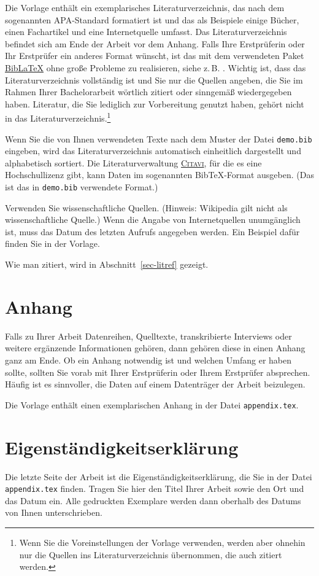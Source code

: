 Die Vorlage enthält ein exemplarisches Literaturverzeichnis, das nach dem
sogenannten APA-Standard formatiert ist und das als Beispiele einige Bücher,
einen Fachartikel und eine Internetquelle umfasst.  Das Literaturverzeichnis
befindet sich am Ende der Arbeit vor dem Anhang.  Falls Ihre Erstprüferin oder
Ihr Erstprüfer ein anderes Format wünscht, ist das mit dem verwendeten Paket
\href{https://www.ctan.org/pkg/biblatex}{Bib\LaTeX} ohne große Probleme zu
realisieren, siehe z.\,B. \parencite[Kap.\ 13]{voss}.  Wichtig ist, dass das
Literaturverzeichnis vollständig ist und Sie nur die Quellen angeben, die Sie
im Rahmen Ihrer Bachelorarbeit wörtlich zitiert oder sinngemäß wiedergegeben
haben.  Literatur, die Sie lediglich zur Vorbereitung genutzt haben, gehört
nicht in das Literaturverzeichnis.\footnote{Wenn Sie die Voreinstellungen der
  Vorlage verwenden, werden aber ohnehin nur die Quellen ins
  Literaturverzeichnis übernommen, die auch zitiert werden.}

Wenn Sie die von Ihnen verwendeten Texte nach dem Muster der Datei
\texttt{demo.bib} eingeben, wird das Literaturverzeichnis automatisch
einheitlich dargestellt und alphabetisch sortiert.  Die Literaturverwaltung
\href{https://de.wikipedia.org/wiki/Citavi}{\textsc{Citavi}}, für die es eine
Hochschullizenz gibt, kann Daten im sogenannten Bib\TeX-Format ausgeben.  (Das
ist das in \texttt{demo.bib} verwendete Format.)

Verwenden Sie wissenschaftliche Quellen.  (Hinweis: Wikipedia gilt nicht als
wissenschaftliche Quelle.)  Wenn die Angabe von Internetquellen unumgänglich
ist, muss das Datum des letzten Aufrufs angegeben werden.  Ein Beispiel dafür
finden Sie in der Vorlage.

Wie man zitiert, wird in Abschnitt~\ref{sec-litref} gezeigt.

\section{Anhang}\label{sec-app}

Falls zu Ihrer Arbeit Datenreihen, Quelltexte, transkribierte Interviews oder
weitere ergänzende Informationen gehören, dann gehören diese in einen Anhang
ganz am Ende.  Ob ein Anhang notwendig ist und welchen Umfang er haben sollte,
sollten Sie vorab mit Ihrer Erstprüferin oder Ihrem Erstprüfer absprechen.
Häufig ist es sinnvoller, die Daten auf einem Datenträger der Arbeit
beizulegen.

Die Vorlage enthält einen exemplarischen Anhang in der Datei
\texttt{appendix.tex}.

\section{Eigenständigkeitserklärung}

Die letzte Seite der Arbeit ist die Eigenständigkeitserklärung, die Sie in der
Datei \texttt{appendix.tex} finden.  Tragen Sie hier den Titel Ihrer Arbeit
sowie den Ort und das Datum ein.  Alle gedruckten Exemplare werden dann
oberhalb des Datums von Ihnen unterschrieben.
